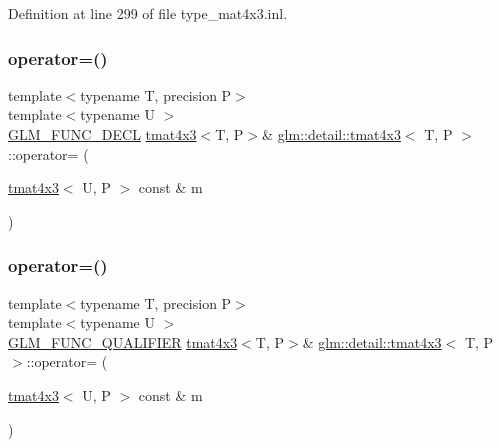 Definition at line 299 of file type\+\_\+mat4x3.\+inl.

\mbox{\label{structglm_1_1detail_1_1tmat4x3_a78d228bf3b4923aaf3514d63d4bb4afd}} 
\subsubsection{\texorpdfstring{operator=()}{operator=()}\hspace{0.1cm}{\footnotesize\ttfamily [2/3]}}
{\footnotesize\ttfamily template$<$typename T, precision P$>$ \\
template$<$typename U $>$ \\
\hyperlink{setup_8hpp_ab2d052de21a70539923e9bcbf6e83a51}{G\+L\+M\+\_\+\+F\+U\+N\+C\+\_\+\+D\+E\+CL} \hyperlink{structglm_1_1detail_1_1tmat4x3}{tmat4x3}$<$T, P$>$\& \hyperlink{structglm_1_1detail_1_1tmat4x3}{glm\+::detail\+::tmat4x3}$<$ T, P $>$\+::operator= (\begin{DoxyParamCaption}\item[{\hyperlink{structglm_1_1detail_1_1tmat4x3}{tmat4x3}$<$ U, P $>$ const \&}]{m }\end{DoxyParamCaption})}

\mbox{\label{structglm_1_1detail_1_1tmat4x3_a887443085fbd9cd29710306c99edede2}} 
\subsubsection{\texorpdfstring{operator=()}{operator=()}\hspace{0.1cm}{\footnotesize\ttfamily [3/3]}}
{\footnotesize\ttfamily template$<$typename T, precision P$>$ \\
template$<$typename U $>$ \\
\hyperlink{setup_8hpp_a33fdea6f91c5f834105f7415e2a64407}{G\+L\+M\+\_\+\+F\+U\+N\+C\+\_\+\+Q\+U\+A\+L\+I\+F\+I\+ER} \hyperlink{structglm_1_1detail_1_1tmat4x3}{tmat4x3}$<$T, P$>$\& \hyperlink{structglm_1_1detail_1_1tmat4x3}{glm\+::detail\+::tmat4x3}$<$ T, P $>$\+::operator= (\begin{DoxyParamCaption}\item[{\hyperlink{structglm_1_1detail_1_1tmat4x3}{tmat4x3}$<$ U, P $>$ const \&}]{m }\end{DoxyParamCaption})}



